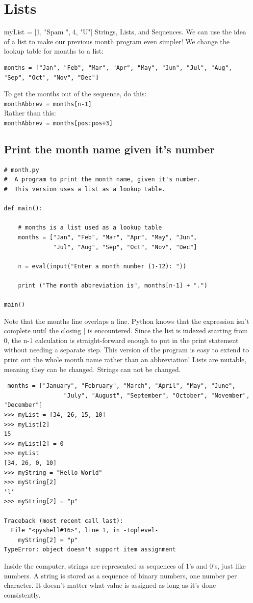 \documentclass[12pt,a4paper,final,twoside,titlepage]{book}
\begin{document}
\section{Lists}
myList = [1, "Spam ", 4, "U"] Strings, Lists, and Sequences. We can use the idea of a list to make our previous month program even simpler! We change the lookup table for months to a list:
\begin{lstlisting}
months = ["Jan", "Feb", "Mar", "Apr", "May", "Jun", "Jul", "Aug", "Sep", "Oct", "Nov", "Dec"]
\end{lstlisting}
To get the months out of the sequence, do this: \\
\texttt{monthAbbrev = months[n-1]}\\
Rather than this:\\
\texttt{monthAbbrev = months[pos:pos+3]}

\subsection{Print the month name given it's number}
\begin{lstlisting}
# month.py
#  A program to print the month name, given it's number.
#  This version uses a list as a lookup table.

def main():
    
    # months is a list used as a lookup table
    months = ["Jan", "Feb", "Mar", "Apr", "May", "Jun",
              "Jul", "Aug", "Sep", "Oct", "Nov", "Dec"]
    
    n = eval(input("Enter a month number (1-12): "))

    print ("The month abbreviation is", months[n-1] + ".")

main()
\end{lstlisting}
Note that the months line overlaps a line. Python knows that the expression isn’t complete until the closing ] is encountered. Since the list is indexed starting from 0, the n-1 calculation is straight-forward enough to put in the print statement without needing a separate step. This version of the program is easy to extend to print out the whole month name rather than an abbreviation! 
Lists are mutable, meaning they can be changed. Strings can not be changed.
\begin{lstlisting}
 months = ["January", "February", "March", "April", "May", "June", 
                 "July", "August", "September", "October", "November", "December"]
>>> myList = [34, 26, 15, 10]
>>> myList[2]
15
>>> myList[2] = 0
>>> myList
[34, 26, 0, 10]
>>> myString = "Hello World"
>>> myString[2]
'l'
>>> myString[2] = "p"

Traceback (most recent call last):
  File "<pyshell#16>", line 1, in -toplevel-
    myString[2] = "p"
TypeError: object doesn't support item assignment
\end{lstlisting}
Inside the computer, strings are represented as sequences of 1’s and 0’s, just like numbers. A string is stored as a sequence of binary numbers, one number per character. It doesn’t matter what value is assigned as long as it’s done consistently.
\end{document}

